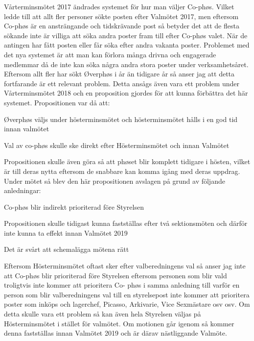 \documentclass[../_main/handlingar.tex]{subfiles}
\begin{document}
Vårterminsmötet 2017 ändrades systemet för hur man väljer Co-phøs. Vilket ledde till att allt fler
personer sökte posten efter Valmötet 2017, men eftersom Co-phøs är en ansträngande och
tidskrävande post så betyder det att de flesta sökande inte är villiga att söka andra poster fram till
efter Co-phøs valet. När de antingen har fått posten eller får söka efter andra vakanta poster.
Problemet med det nya systemet är att man kan förlora många drivna och engagerade medlemmar
då de inte kan söka några andra stora poster under verksamhetsåret. Eftersom allt fler har sökt
Øverphøs i år än tidigare år så anser jag att detta fortfarande är ett relevant problem. Detta ansågs
även vara ett problem under Vårterminsmötet 2018 och en proposition gjordes för att kunna
förbättra det här systemet. Propositionen var då att:

\begin{dashlist}
\item Øverphøs väljs under hösterminsmötet och hösterminsmötet hålls i en god tid innan
valmötet
\item Val av co-phøs skulle ske direkt efter Hösterminsmötet och innan Valmötet
\end{dashlist}

Propositionen skulle även göra så att phøset blir komplett tidigare i hösten, vilket är till deras nytta
eftersom de snabbare kan komma igång med deras uppdrag. Under mötet så blev den här
propositionen avslagen på grund av följande anledningar:

\begin{dashlist}
  \item Co-phøs blir indirekt prioriterad före Styrelsen
  \item Propositionen skulle tidigast kunna fastställas efter två sektionsmöten och därför inte kunna
  ta effekt innan Valmötet 2019
  \item Det är svårt att schemalägga mötena rätt
\end{dashlist}

Eftersom Hösterminsmötet oftast sker efter valberedningens val så anser jag inte att Co-phøs blir
prioriterad före Styrelsen eftersom personen som blir vald troligtvis inte kommer att prioritera Co-
phøs i samma anledning till varför en person som blir valberedningens val till en styrelsepost inte
kommer att prioritera poster som inköps och lagerchef, Picasso, Arkivarie, Vice Sexmästare osv osv.
Om detta skulle vara ett problem så kan även hela Styrelsen väljas på Hösterminsmötet i stället för
valmötet. Om motionen går igenom så kommer denna fastställas innan Valmötet 2019 och är därav
nästliggande Valmöte.
\end{document}
